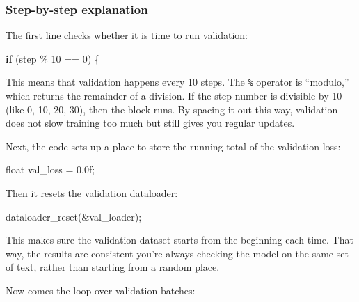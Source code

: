 \documentclass[
  letterpaper,
  DIV=11,
  numbers=noendperiod]{scrreprt}
\newenvironment{Shaded}{\begin{snugshade}}{\end{snugshade}}
\newcommand{\BuiltInTok}[1]{\textcolor[rgb]{0.00,0.23,0.31}{#1}}
\newcommand{\ControlFlowTok}[1]{\textcolor[rgb]{0.00,0.23,0.31}{\textbf{#1}}}
\newcommand{\DataTypeTok}[1]{\textcolor[rgb]{0.68,0.00,0.00}{#1}}
\newcommand{\DecValTok}[1]{\textcolor[rgb]{0.68,0.00,0.00}{#1}}
\newcommand{\FloatTok}[1]{\textcolor[rgb]{0.68,0.00,0.00}{#1}}
\newcommand{\NormalTok}[1]{\textcolor[rgb]{0.00,0.23,0.31}{#1}}
\newcommand{\OperatorTok}[1]{\textcolor[rgb]{0.37,0.37,0.37}{#1}}
\begin{document}
\subsubsection{Step-by-step explanation}\label{step-by-step-explanation}

The first line checks whether it is time to run validation:

\begin{Shaded}
\begin{Highlighting}[]
\ControlFlowTok{if} \OperatorTok{(}\NormalTok{step }\OperatorTok{\%} \DecValTok{10} \OperatorTok{==} \DecValTok{0}\OperatorTok{)} \OperatorTok{\{}
\end{Highlighting}
\end{Shaded}

This means that validation happens every 10 steps. The \texttt{\%}
operator is ``modulo,'' which returns the remainder of a division. If
the step number is divisible by 10 (like 0, 10, 20, 30), then the block
runs. By spacing it out this way, validation does not slow training too
much but still gives you regular updates.

Next, the code sets up a place to store the running total of the
validation loss:

\begin{Shaded}
\begin{Highlighting}[]
\DataTypeTok{float}\NormalTok{ val\_loss }\OperatorTok{=} \FloatTok{0.0}\BuiltInTok{f}\OperatorTok{;}
\end{Highlighting}
\end{Shaded}

Then it resets the validation dataloader:

\begin{Shaded}
\begin{Highlighting}[]
\NormalTok{dataloader\_reset}\OperatorTok{(\&}\NormalTok{val\_loader}\OperatorTok{);}
\end{Highlighting}
\end{Shaded}

This makes sure the validation dataset starts from the beginning each
time. That way, the results are consistent-you're always checking the
model on the same set of text, rather than starting from a random place.

Now comes the loop over validation batches:
\end{document}
